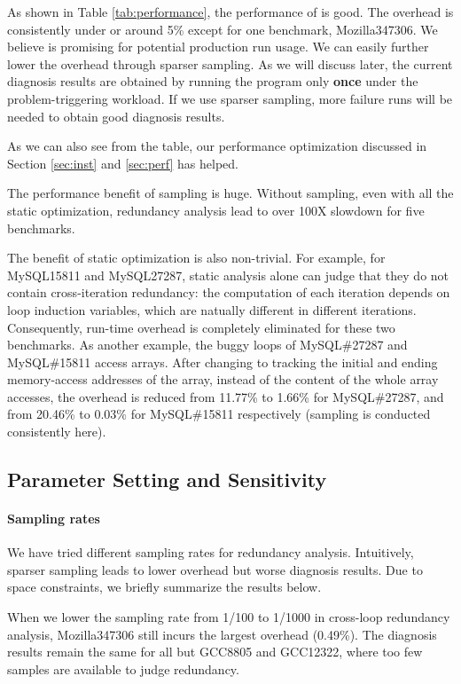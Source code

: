 As shown in Table \ref{tab:performance}, 
the performance of \Tool is good. The overhead is consistently under or around 5\% 
except for one benchmark, Mozilla347306. We believe \Tool is promising for potential production
run usage.
We can easily further lower the overhead through sparser sampling.
As we will discuss later, 
the current diagnosis results are obtained by running the
program only \textbf{once} under the problem-triggering workload.
If we use sparser sampling, more failure runs will be needed to obtain good
diagnosis results.

As we can also see from the table, our performance optimization discussed in 
Section \ref{sec:inst} and \ref{sec:perf} has helped.

The performance benefit of sampling is huge.
Without sampling, even with all the static optimization, redundancy
analysis lead to over 100X slowdown for five benchmarks.

The benefit of static optimization is also non-trivial. 
For example, for MySQL15811 and MySQL27287, static analysis alone can
judge that they do not contain cross-iteration redundancy: the computation of 
each iteration depends on loop induction variables, which are natually different
in different iterations. Consequently, run-time overhead is completely
eliminated for these two benchmarks.
As another example, the buggy loops of MySQL\#27287 and MySQL\#15811 access 
arrays. 
After changing to tracking the initial and ending memory-access addresses
of the array, instead of the content of the whole array accesses,
the overhead is reduced from 11.77\% to 1.66\% for MySQL\#27287, 
and from 20.46\% to 0.03\% for MySQL\#15811 respectively 
(sampling is conducted consistently here). 

\subsection{Parameter Setting and Sensitivity}
\label{sec:sensi}
\paragraph{Sampling rates}
We have tried different sampling rates for redundancy analysis.
Intuitively, sparser sampling leads to lower overhead but worse diagnosis
results. Due to space constraints, we briefly summarize the results below.

When we lower the sampling rate from 1/100 to 1/1000 
in cross-loop redundancy analysis,
Mozilla347306 still incurs the largest overhead (0.49\%). 
The diagnosis results remain the same for all but
GCC8805 and GCC12322, where too few samples are available
to judge redundancy.

